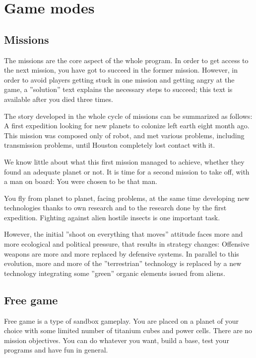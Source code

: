 \section{Game modes}

\subsection{Missions}

The missions are the core aspect of the whole program. In order to get access to the next mission, you have got to succeed in the former mission. However, in order to avoid players getting stuck in one mission and getting angry at the game, a ''solution'' text explains the necessary steps to succeed; this text is available after you died three times.

The story developed in the whole cycle of missions can be summarized as follows: A first expedition looking for new planets to colonize left earth eight month ago. This mission was composed only of robot, and met various problems, including transmission problems, until Houston completely lost contact with it.

We know little about what this first mission managed to achieve, whether they found an adequate planet or not. It is time for a second mission to take off, with a man on board: You were chosen to be that man.

You fly from planet to planet, facing problems, at the same time developing new technologies thanks to own research and to the research done by the first expedition. Fighting against alien hostile insects is one important task.

However, the initial ''shoot on everything that moves'' attitude faces more and more ecological and political pressure, that results in strategy changes: Offensive weapons are more and more replaced by defensive systems. In parallel to this evolution, more and more of the ''terrestrian'' technology is replaced by a new technology integrating some ''green'' organic elements issued from aliens.


\subsection{Free game}

Free game is a type of sandbox gameplay. You are placed on a planet of your choice with some limited number of titanium cubes and power cells. There are no mission objectives. You can do whatever you want, build a base, test your programs and have fun in general.

